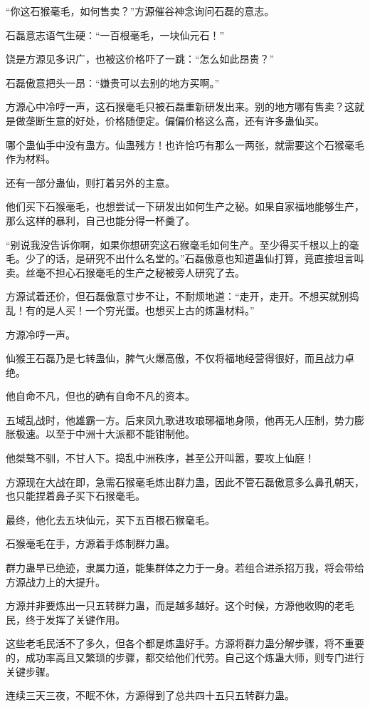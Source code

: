 \begin{this_body}
“你这石猴毫毛，如何售卖？”方源催谷神念询问石磊的意志。

石磊意志语气生硬：“一百根毫毛，一块仙元石！”

饶是方源见多识广，也被这价格吓了一跳：“怎么如此昂贵？”

石磊傲意把头一昂：“嫌贵可以去别的地方买啊。”

方源心中冷哼一声，这石猴毫毛只被石磊重新研发出来。别的地方哪有售卖？这就是做垄断生意的好处，价格随便定。偏偏价格这么高，还有许多蛊仙买。

哪个蛊仙手中没有蛊方。仙蛊残方！也许恰巧有那么一两张，就需要这个石猴毫毛作为材料。

还有一部分蛊仙，则打着另外的主意。

他们买下石猴毫毛，也想尝试一下研发出如何生产之秘。如果自家福地能够生产，那么这样的暴利，自己也能分得一杯羹了。

“别说我没告诉你啊，如果你想研究这石猴毫毛如何生产。至少得买千根以上的毫毛。少了的话，是研究不出什么名堂的。”石磊傲意也知道蛊仙打算，竟直接坦言叫卖。丝毫不担心石猴毫毛的生产之秘被旁人研究了去。

方源试着还价，但石磊傲意寸步不让，不耐烦地道：“走开，走开。不想买就别捣乱！有的是人买！一个穷光蛋。也想买上古的炼蛊材料。”

方源冷哼一声。

仙猴王石磊乃是七转蛊仙，脾气火爆高傲，不仅将福地经营得很好，而且战力卓绝。

他自命不凡，但也的确有自命不凡的资本。

五域乱战时，他雄霸一方。后来凤九歌进攻琅琊福地身陨，他再无人压制，势力膨胀极速。以至于中洲十大派都不能钳制他。

他桀骜不驯，不甘人下。捣乱中洲秩序，甚至公开叫嚣，要攻上仙庭！

方源现在大战在即，急需石猴毫毛炼出群力蛊，因此不管石磊傲意多么鼻孔朝天，也只能捏着鼻子买下石猴毫毛。

最终，他化去五块仙元，买下五百根石猴毫毛。

石猴毫毛在手，方源着手炼制群力蛊。

群力蛊早已绝迹，隶属力道，能集群体之力于一身。若组合进杀招万我，将会带给方源战力上的大提升。

方源并非要炼出一只五转群力蛊，而是越多越好。这个时候，方源他收购的老毛民，终于发挥了关键作用。

这些老毛民活不了多久，但各个都是炼蛊好手。方源将群力蛊分解步骤，将不重要的，成功率高且又繁琐的步骤，都交给他们代劳。自己这个炼蛊大师，则专门进行关键步骤。

连续三天三夜，不眠不休，方源得到了总共四十五只五转群力蛊。


\end{this_body}
